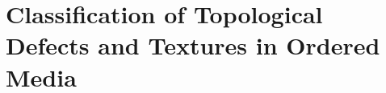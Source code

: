 \section{Classification of Topological Defects and Textures in Ordered Media}
\label{sec:chap6_sec4}

